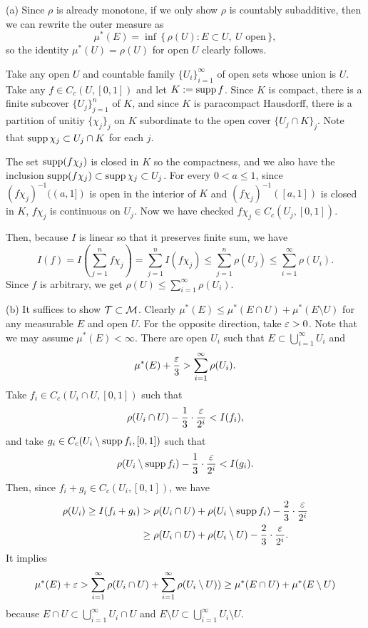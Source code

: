\documentclass{../note}
\begin{document}
\begin{pf}
(a)
Since $\rho$ is already monotone, if we only show $\rho$ is countably subadditive, then we can rewrite the outer measure as
\[\mu^*(E)=\inf\,\{\,\rho(U):E\subset U,\ U\text{ open}\,\},\]
so the identity $\mu^*(U)=\rho(U)$ for open $U$ clearly follows.

Take any open $U$ and countable family $\{U_i\}_{i=1}^\infty$ of open sets whose union is $U$.
Take any $f\in C_c(U,[0,1])$ and let $K:=\operatorname{supp} f$.
Since $K$ is compact, there is a finite subcover $\{U_j\}_{j=1}^n$ of $K$, and since $K$ is paracompact Hausdorff, there is a partition of unitiy $\{\chi_j\}_j$ on $K$ subordinate to the open cover $\{U_j\cap K\}_j$.
Note that $\operatorname{supp}\chi_j\subset U_j\cap K$ for each $j$.

The set $\operatorname{supp}(f\chi_j)$ is closed in $K$ so the compactness, and we also have the inclusion $\operatorname{supp}(f\chi_j)\subset\operatorname{supp}\chi_j\subset U_j$.
For every $0<a\le 1$, since $(f\chi_j)^{-1}((a,1])$ is open in the interior of $K$ and $(f\chi_j)^{-1}([a,1])$ is closed in $K$, $f\chi_j$ is continuous on $U_j$.
Now we have checked $f\chi_j\in C_c(U_j,[0,1])$.

Then, because $I$ is linear so that it preserves finite sum, we have
\[I(f)=I\left(\sum_{j=1}^n f\chi_j\right)=\sum_{j=1}^n I(f\chi_j)\le\sum_{j=1}^n\rho(U_j)\le\sum_{i=1}^\infty\rho(U_i).\]
Since $f$ is arbitrary, we get $\rho(U)\le\sum_{i=1}^\infty\rho(U_i)$.

(b)
It suffices to show $\mathcal{T}\subset\mathcal{M}$.
Clearly $\mu^*(E)\le\mu^*(E\cap U)+\mu^*(E\setminus U)$ for any measurable $E$ and open $U$.
For the opposite direction, take $\varepsilon>0$.
Note that we may assume $\mu^*(E)<\infty$.
There are open $U_i$ such that $E\subset\bigcup_{i=1}^\infty U_i$ and
\[\mu^*(E)+\frac{\varepsilon}3>\sum_{i=1}^\infty\rho(U_i).\]
Take $f_i\in C_c(U_i\cap U,[0,1])$ such that
\[\rho(U_i\cap U)-\frac13\cdot\frac{\varepsilon}{2^i}<I(f_i),\]
and take $g_i\in C_c(U_i\setminus\operatorname{supp} f_i,[0,1])$ such that
\[\rho(U_i\setminus\operatorname{supp} f_i)-\frac13\cdot\frac{\varepsilon}{2^i}<I(g_i).\]
Then, since $f_i+g_i\in C_c(U_i,[0,1])$, we have
\begin{align*}
\rho(U_i)\ge I(f_i+g_i)
&>\rho(U_i\cap U)+\rho(U_i\setminus\operatorname{supp} f_i)-\frac23\cdot\frac{\varepsilon}{2^i}\\
&\ge\rho(U_i\cap U)+\rho(U_i\setminus U)-\frac23\cdot\frac{\varepsilon}{2^i}.
\end{align*}
It implies
\[\mu^*(E)+\varepsilon>\sum_{i=1}^\infty\rho(U_i\cap U)+\sum_{i=1}^\infty\rho(U_i\setminus U))\ge\mu^*(E\cap U)+\mu^*(E\setminus U)\]
because $E\cap U\subset\bigcup_{i=1}^\infty U_i\cap U$ and $E\setminus U\subset\bigcup_{i=1}^\infty U_i\setminus U$.



\end{pf}
\end{document}
